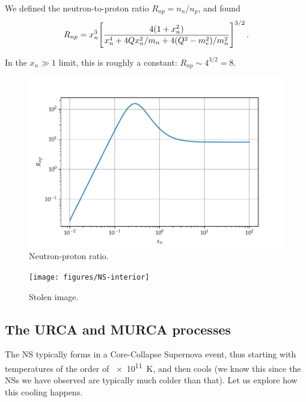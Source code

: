 \documentclass[main.tex]{subfiles}
\begin{document}

We defined the neutron-to-proton ratio \(R_{np} = n_n / n_p\), and found 
%
\begin{align}
R_{np} = x_n^3 \qty[\frac{4 (1 + x_n^2)}{x_n^4 + 4 Q x_n^2 / m_n + 4 (Q^2- m_e^2) / m_n^2}]^{3/2}
\,.
\end{align}

In the \(x_n \gg 1\) limit, this is roughly a constant: \(R_{np} \sim 4^{3/2} = 8\).

\begin{figure}[ht]
\centering
\includegraphics[width=\textwidth]{figures/neutron-proton-ratio}
\caption{Neutron-proton ratio.}
\label{fig:neutron-proton-ratio}
\end{figure}



\begin{figure}[ht]
\centering
\texttt{[image: figures/NS-interior]}
\caption{Stolen image.}
\label{fig:NS-interior}
\end{figure}

\subsection{The URCA and MURCA processes}

The NS typically forms in a Core-Collapse Supernova event, thus starting with temperatures of the order of \SI{e11}{K}, and then cools (we know this since the NSs we have observed are typically much colder than that). Let us explore how this cooling happens.
\end{document}
